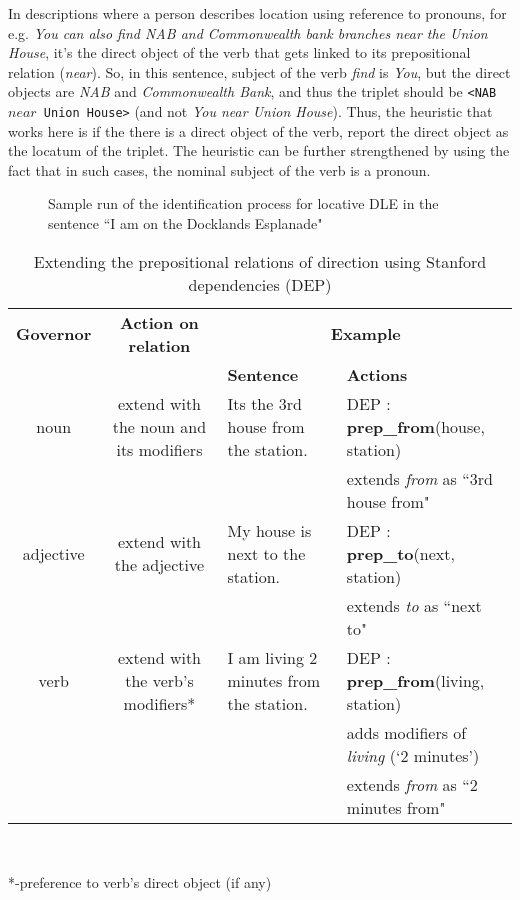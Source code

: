 \documentclass{acm_proc_article-sp}
\begin{document}
In descriptions where a person describes location using reference to pronouns, for e.g. \textit{You can also find NAB and Commonwealth bank branches near the Union House}, it's the direct object of the verb that gets linked to its prepositional relation (\textit{near}). So, in this sentence, subject of the verb \textit{find} is \textit{You}, but the direct objects are \textit{NAB} and \textit{Commonwealth Bank}, and thus the triplet should be \texttt{<NAB $near$ Union House>} (and not \textit{You near Union House}). Thus, the heuristic that works here is if the there is a direct object of the verb, report the direct object as the locatum of the triplet. The heuristic can be further strengthened by using the fact that in such cases, the nominal subject of the verb is a pronoun.
\begin{figure}
\centering
\caption{Sample run of the identification process for locative DLE in the sentence  ``I am on the Docklands Esplanade"}
\label{fig:phase1}
\end{figure}
\begin{table*}
\centering
\caption{Extending the prepositional relations of direction using Stanford dependencies (DEP)}
\begin{tabular}{|c|c|p{4cm}|p{5cm}|} \hline
\textbf{Governor}&\textbf{Action on relation}&\multicolumn{2}{|c|}{\textbf{Example}} \\ \cline{3-4} 
&&\textbf{Sentence}&\textbf{Actions}\\ \hline
noun & extend with the noun and its modifiers&Its the 3rd house from the station.&DEP : \textbf{prep\_from}(house, station) \\&&&extends \textit{from} as ``3rd house from" \\ \hline
adjective & extend with the adjective&My house is next to the station.&DEP : {\textbf{prep\_to}}(next, station) \\&&& extends \textit{to} as ``next to"\\ \hline
verb & extend with the verb's modifiers*&I am living 2 minutes from the station.&DEP : \textbf{prep\_from}(living, station)\\&&& adds modifiers of \textit{living} (`2 minutes')\\&&& extends \textit{from} as ``2 minutes from"\\ 
\hline\end{tabular}
\\ \begin{flushleft}
*-preference to verb's direct object (if any)
\end{flushleft}
\label{table:partial}
\end{table*}
\end{document}
